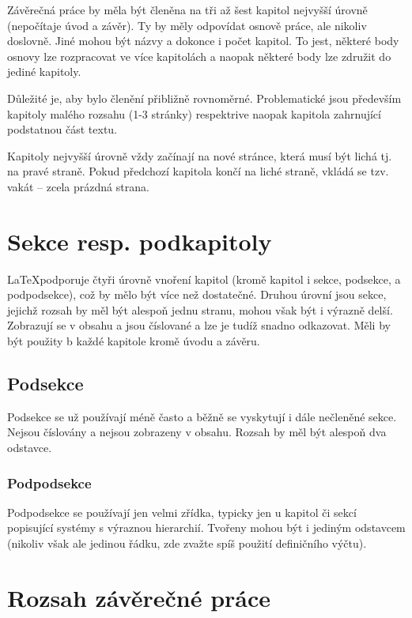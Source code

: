 \documentclass[male,czech,api_bc]{kitheses}
\begin{document}
Závěrečná práce by měla být členěna na tři až šest kapitol nejvyšší úrovně (nepočítaje úvod a závěr). Ty by měly odpovídat osnově práce, ale nikoliv doslovně. Jiné mohou být názvy a dokonce i počet kapitol. To jest, některé body osnovy lze rozpracovat ve více kapitolách a naopak některé body lze združit do jediné kapitoly.

Důležité je, aby bylo členění přibližně rovnoměrné. Problematické jsou především kapitoly malého rozsahu (1-3 stránky) respektrive naopak kapitola zahrnující podstatnou část textu.

Kapitoly nejvyšší úrovně vždy začínají na nové stránce, která musí být lichá tj. na pravé straně. Pokud předchozí kapitola končí na liché straně, vkládá se tzv. vakát -- zcela prázdná strana. 

\section{Sekce resp. podkapitoly}

\LaTeX podporuje čtyři úrovně vnoření kapitol (kromě kapitol i sekce, podsekce, a podpodsekce), což by mělo být více než dostatečné. Druhou úrovní jsou sekce, jejichž rozsah by měl být alespoň jednu stranu, mohou však být
i výrazně delší. Zobrazují se v obsahu a jsou číslované a lze je tudíž snadno odkazovat. Měli by být použity b každé kapitole kromě úvodu a závěru.

\subsection{Podsekce}

Podsekce se už používají méně často a běžně se vyskytují i dále nečleněné sekce. Nejsou číslovány a nejsou zobrazeny v obsahu. Rozsah by měl být alespoň dva odstavce.

\subsubsection{Podpodsekce}

Podpodsekce se používají jen velmi zřídka, typicky jen u kapitol či sekcí popisující systémy s výraznou hierarchií. Tvořeny mohou být i jediným odstavcem (nikoliv však ale jedinou řádku, zde zvažte spíš použití definičního výčtu).

\section{Rozsah závěrečné práce}
\end{document}
